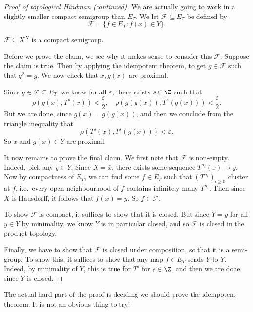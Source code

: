 \documentclass[a4paper]{article}
\begin{document}
\begin{proof}[Proof of topological Hindman (continued)]
  We are actually going to work in a slightly smaller compact semigroup than $E_T$. We let $\mathcal{F} \subseteq E_T$ be defined by
  \[
    \mathcal{F} = \{f \in E_T: f(x) \in Y\}.
  \]
  \begin{claim}
    $\mathcal{F} \subseteq X^X$ is a compact semigroup.
  \end{claim}
  Before we prove the claim, we see why it makes sense to consider this $\mathcal{F}$. Suppose the claim is true. Then by applying the idempotent theorem, to get $g \in \mathcal{F}$ such that $g^2 = g$. We now check that $x, g(x)$ are proximal.

  Since $g \in \mathcal{F} \subseteq E_T$, we know for all $\varepsilon$, there exists $s \in \Z$ such that
  \[
    \rho(g(x), T^s(x)) < \frac{\varepsilon}{2},\quad \rho(g(g(x)), T^s(g(x))) < \frac{\varepsilon}{2}.
  \]
  But we are done, since $g(x) = g(g(x))$, and then we conclude from the triangle inequality that
  \[
    \rho(T^s(x), T^s(g(x))) < \varepsilon.
  \]
  So $x$ and $g(x) \in Y$ are proximal.

  It now remains to prove the final claim. We first note that $\mathcal{F}$ is non-empty. Indeed, pick any $y \in Y$. Since $X = \bar{x}$, there exists some sequence $T^{n_i}(x) \to y$. Now by compactness of $E_T$, we can find some $f \in E_T$ such that $(T^{n_i})_{i \geq 0}$ cluster at $f$, i.e.\ every open neighbourhood of $f$ contains infinitely many $T^{n_i}$. Then since $X$ is Hausdorff, it follows that $f(x) = y$. So $f \in \mathcal{F}$.

  To show $\mathcal{F}$ is compact, it suffices to show that it is closed. But since $Y = \bar{y}$ for all $y \in Y$ by minimality, we know $Y$ is in particular closed, and so $\mathcal{F}$ is closed in the product topology.

  Finally, we have to show that $\mathcal{F}$ is closed under composition, so that it is a semi-group. To show this, it suffices to show that any map $f \in E_T$ sends $Y$ to $Y$. Indeed, by minimality of $Y$, this is true for $T^s$ for $s \in \Z$, and then we are done since $Y$ is closed.
\end{proof}
The actual hard part of the proof is deciding we should prove the idempotent theorem. It is not an obvious thing to try!
\end{document}
